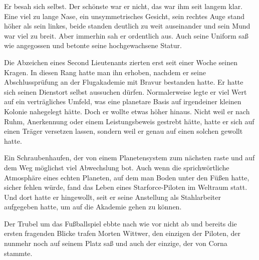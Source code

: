 \par

Er besah sich selbst. Der schönste war er nicht, das war ihm seit langem klar. Eine viel zu lange Nase, ein unsymmetrisches Gesicht, sein rechtes Auge stand höher als sein linkes, beide standen deutlich zu weit auseinander und sein Mund war viel zu breit. Aber immerhin sah er ordentlich aus. Auch seine Uniform saß wie angegossen und betonte seine hochgewachsene Statur.

\par

Die Abzeichen eines Second Lieutenants zierten erst seit einer Woche seinen Kragen. In diesen Rang hatte man ihn erhoben, nachdem er seine Abschlussprüfung an der Flugakademie mit Bravur bestanden hatte. Er hatte sich seinen Dienstort selbst aussuchen dürfen. Normalerweise legte er viel Wert auf ein verträgliches Umfeld, was eine planetare Basis auf irgendeiner kleinen Kolonie nahegelegt hätte. Doch er wollte etwas höher hinaus. Nicht weil er nach Ruhm, Anerkennung oder einem Leistungsbeweis gestrebt hätte, hatte er sich auf einen Träger versetzen lassen, sondern weil er genau auf einen solchen gewollt hatte.

\par

Ein Schraubenhaufen, der von einem Planetensystem zum nächsten raste und auf dem Weg möglichst viel Abwechslung bot. Auch wenn die sprichwörtliche Atmosphäre eines echten Planeten, auf dem man Boden unter den Füßen hatte, sicher fehlen würde, fand das Leben eines Starforce-Piloten im Weltraum statt. Und dort hatte er hingewollt, seit er seine Anstellung als Stahlarbeiter aufgegeben hatte, um auf die Akademie gehen zu können.

\par

Der Trubel um das Fußballspiel ebbte nach wie vor nicht ab und bereits die ersten fragenden Blicke trafen Morten Wittwer, den einzigen der Piloten, der nunmehr noch auf seinem Platz saß und auch der einzige, der von Corna stammte.